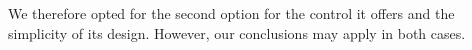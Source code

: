 \documentclass[10pt,journal,compsoc]{IEEEtran}
\begin{document}
We therefore opted for the second option for the control it offers and the simplicity of its design. However, our conclusions may apply in both cases.

%	
%	
%	
	
\end{document}
